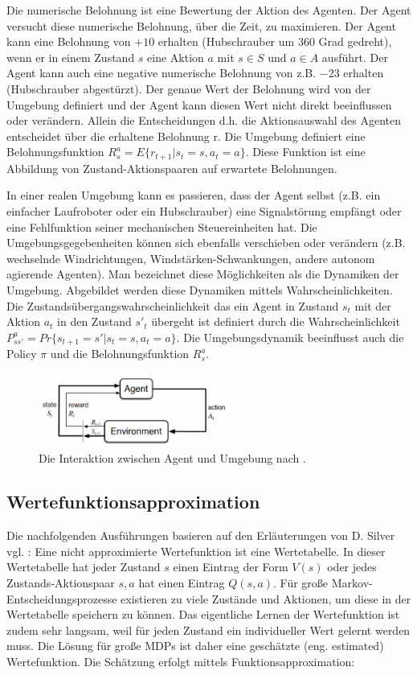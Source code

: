 \documentclass[conference]{IEEEtran}
\begin{document}
Die numerische Belohnung ist eine Bewertung der Aktion des Agenten. Der Agent versucht diese numerische Belohnung, über die Zeit, zu maximieren. Der Agent kann eine Belohnung von $+10$ erhalten (Hubschrauber um 360 Grad gedreht), wenn er in einem Zustand $s$ eine Aktion $a$ mit $s\in S$ und $a\in A$ ausführt. Der Agent kann auch eine negative numerische Belohnung von z.B. $-23$ erhalten (Hubschrauber abgestürzt). Der genaue Wert der Belohnung wird von der Umgebung definiert und der Agent kann diesen Wert nicht direkt beeinflussen oder verändern. Allein die Entscheidungen d.h. die Aktionsauswahl des Agenten entscheidet über die erhaltene Belohnung r. Die Umgebung definiert eine Belohnungsfunktion $R_s^a = E\{ r_{t+1} | s_t = s, a_t = a \}$. Diese Funktion ist eine Abbildung von Zustand-Aktionspaaren auf erwartete Belohnungen.

In einer realen Umgebung kann es passieren, dass der Agent selbst (z.B. ein einfacher Laufroboter oder ein Hubschrauber) eine Signalstörung empfängt oder eine Fehlfunktion seiner mechanischen Steuereinheiten hat. Die Umgebungsgegebenheiten können sich ebenfalls verschieben oder verändern (z.B. wechselnde Windrichtungen, Windstärken-Schwankungen, andere autonom agierende Agenten). Man bezeichnet diese Möglichkeiten als die Dynamiken der Umgebung. Abgebildet werden diese Dynamiken mittels Wahrscheinlichkeiten. Die Zustandsübergangswahrscheinlichkeit das ein Agent in Zustand $s_t$ mit der Aktion $a_t$ in den Zustand $s'_t$ übergeht ist definiert durch die Wahrscheinlichkeit $P^a_{ss'} = Pr \{ s_{t+1} = s' | s_t = s, a_t = a \}.$ Die Umgebungsdynamik beeinflusst auch die Policy $\pi$ und die Belohnungsfunktion $R^a_s$.

\begin{figure}[!t]
\centering
\includegraphics[width=2.5in]{agent_environment}
\caption{Die Interaktion zwischen Agent und Umgebung nach \cite{sutton_barto_12}.}
\label{agent_environment}
\end{figure}

\subsection{Wertefunktionsapproximation}
Die nachfolgenden Ausführungen basieren auf den Erläuterungen von D. Silver vgl. \cite{silver_15}: Eine nicht approximierte Wertefunktion ist eine Wertetabelle. In dieser Wertetabelle hat jeder Zustand $s$ einen Eintrag der Form $V(s)$ oder jedes Zustands-Aktionspaar $s, a$ hat einen Eintrag $Q(s,a)$. Für große Markov-Entscheidungsprozesse existieren zu viele Zustände und Aktionen, um diese in der Wertetabelle speichern zu können. Das eigentliche Lernen der Wertefunktion ist zudem sehr langsam, weil für jeden Zustand ein individueller Wert gelernt werden muss. Die Lösung für große MDPs ist daher eine geschätzte (eng. estimated) Wertefunktion. Die Schätzung erfolgt mittels Funktionsapproximation:
\end{document}
